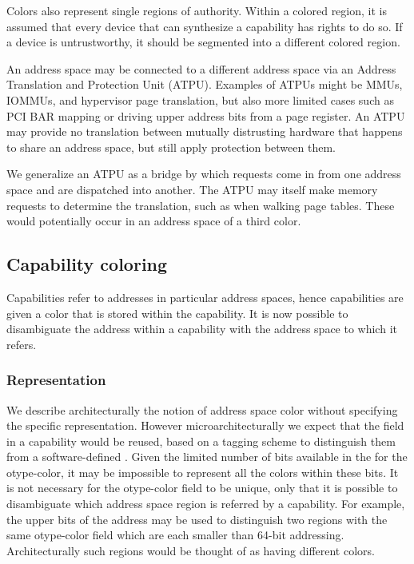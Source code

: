 Colors also represent single regions of authority.  Within a colored region, it is assumed that every device that can synthesize a capability has rights to do so.  If a device is untrustworthy, it should be segmented into a different colored region.

An address space may be connected to a different address space via an Address Translation and Protection Unit (ATPU).  Examples of ATPUs might be MMUs, IOMMUs, and hypervisor page translation, but also more limited cases such as PCI BAR mapping or driving upper address bits from a page register.  An ATPU may provide no translation between mutually distrusting hardware that happens to share an address space, but still apply protection between them.

We generalize an ATPU as a bridge by which requests come in from one address space and are dispatched into another.  The ATPU may itself make memory requests to determine the translation, such as when walking page tables.  These would potentially occur in an address space of a third color.

\subsection{Capability coloring}
Capabilities refer to addresses in particular address spaces, hence capabilities are given a color that is stored within the capability.  It is now possible to disambiguate the address within a capability with the address space to which it refers.

\subsubsection{Representation}
We describe architecturally the notion of address space color without specifying the specific representation.
However microarchitecturally we expect that the \cotype{} field in a capability would be reused, based on a tagging scheme to distinguish them from a software-defined \cotype{}.  Given the limited number of bits available in the \cotype{} for the otype-color, it may be impossible to represent all the colors within these bits.  It is not necessary for the otype-color field to be unique, only that it is possible to disambiguate which address space region is referred by a capability.  For example, the upper bits of the address may be used to distinguish two regions with the same otype-color field which are each smaller than 64-bit addressing.  Architecturally such regions would be thought of as having different colors.

